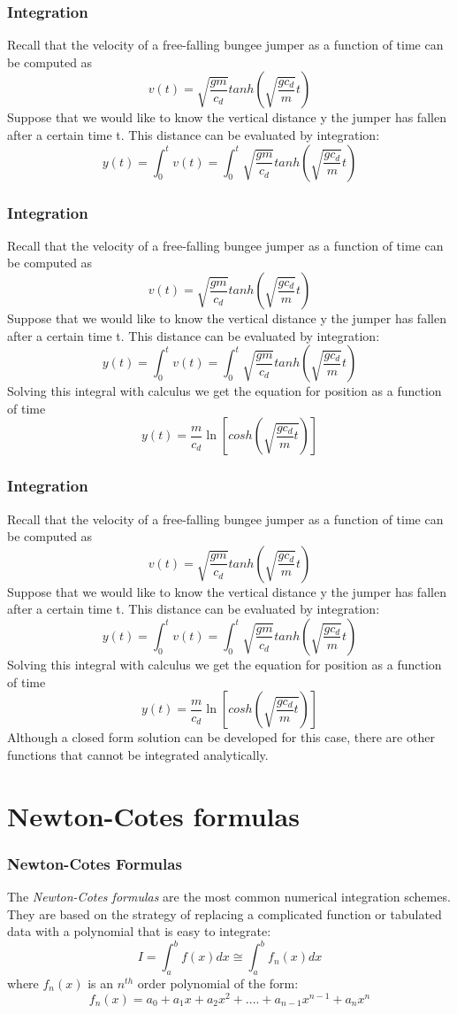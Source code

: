 \documentclass{if-beamer}
\begin{document}
\begin{frame}[t]
	\frametitle{Integration}
	Recall that the velocity of a free-falling bungee jumper as a function of time can be
	computed as
	$$v(t) = \sqrt{\frac{gm}{c_d}}tanh\left(\sqrt{\frac{gc_d}{m}}t\right) $$
	Suppose that we would like to know the vertical distance y the jumper has fallen after a
	certain time t. This distance can be evaluated by integration:
	$$y(t) = \int_{0}^{t} v(t) = \int_{0}^{t} \sqrt{\frac{gm}{c_d}}tanh\left(\sqrt{\frac{gc_d}{m}}t\right) $$
\end{frame}

\begin{frame}[t]
	\frametitle{Integration}
	Recall that the velocity of a free-falling bungee jumper as a function of time can be
	computed as
	$$v(t) = \sqrt{\frac{gm}{c_d}}tanh\left(\sqrt{\frac{gc_d}{m}}t\right) $$
	Suppose that we would like to know the vertical distance y the jumper has fallen after a
	certain time t. This distance can be evaluated by integration:
	$$y(t) = \int_{0}^{t} v(t) = \int_{0}^{t} \sqrt{\frac{gm}{c_d}}tanh\left(\sqrt{\frac{gc_d}{m}}t\right) $$
	Solving this integral with calculus we get the equation for position as a function of time
	$$y(t) =\frac{m}{c_d}\ln\left[cosh\left(\sqrt{\frac{gc_d}{m}t}\right)\right] $$
\end{frame}

\begin{frame}[t]
	\frametitle{Integration}
	Recall that the velocity of a free-falling bungee jumper as a function of time can be
	computed as
	$$v(t) = \sqrt{\frac{gm}{c_d}}tanh\left(\sqrt{\frac{gc_d}{m}}t\right) $$
	Suppose that we would like to know the vertical distance y the jumper has fallen after a
	certain time t. This distance can be evaluated by integration:
	$$y(t) = \int_{0}^{t} v(t) = \int_{0}^{t} \sqrt{\frac{gm}{c_d}}tanh\left(\sqrt{\frac{gc_d}{m}}t\right) $$
	Solving this integral with calculus we get the equation for position as a function of time
	$$y(t) =\frac{m}{c_d}\ln\left[cosh\left(\sqrt{\frac{gc_d}{m}t}\right)\right] $$
	Although a closed form solution can be developed for this case, there are other functions that cannot be integrated analytically.
\end{frame}
\section{Newton-Cotes formulas}
\begin{frame}
	\frametitle{Newton-Cotes Formulas}
	The \textit{Newton-Cotes formulas} are the most common numerical integration schemes. They are based on the strategy of replacing a complicated function or tabulated data with a polynomial that is easy to integrate:
	$$I = \int_{a}^{b}f(x)dx \cong \int_{a}^{b}f_n(x)dx $$
	where $f_n(x)$ is an $n^{th}$ order polynomial of the form:
	$$f_n(x) =a_0+a_1x+a_2x^2+....+a_{n-1}x^{n-1}+a_nx^n$$
\end{frame}
\end{document}
